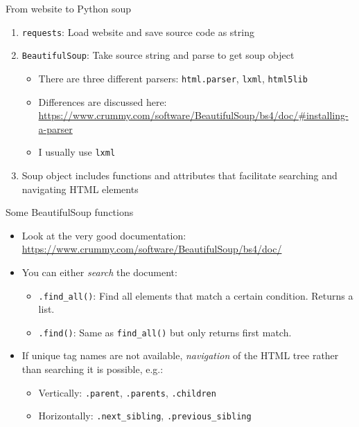\begin{frame}[fragile]{From website to Python soup}
\begin{enumerate}
	\item \verb!requests!: Load website and save source code as string
	\item \verb!BeautifulSoup!: Take source string and parse to get soup object
		\begin{itemize}
			\item There are three different parsers: \verb!html.parser!, \verb!lxml!, \verb!html5lib!
			\item Differences are discussed here: \url{https://www.crummy.com/software/BeautifulSoup/bs4/doc/#installing-a-parser}
			\item I usually use \verb!lxml!
		\end{itemize}
	\item Soup object includes functions and attributes that facilitate searching and navigating HTML elements
\end{enumerate}
\end{frame}

\begin{frame}[fragile]{Some BeautifulSoup functions}
\begin{itemize}
	\item Look at the very good documentation: \url{https://www.crummy.com/software/BeautifulSoup/bs4/doc/}
	\item You can either \textit{search} the document:
	\begin{itemize}
		\item \verb!.find_all()!: Find all elements that match a certain condition. Returns a list.
		\item \verb!.find()!: Same as \verb!find_all()! but only returns first match.
	\end{itemize}
	\item If unique tag names are not available, \textit{navigation} of the HTML tree rather than searching it is possible, e.g.:
	\begin{itemize}
		\item Vertically: \verb!.parent!, \verb!.parents!, \verb!.children!
		\item Horizontally: \verb!.next_sibling!, \verb!.previous_sibling!
	\end{itemize}
\end{itemize}
\end{frame}